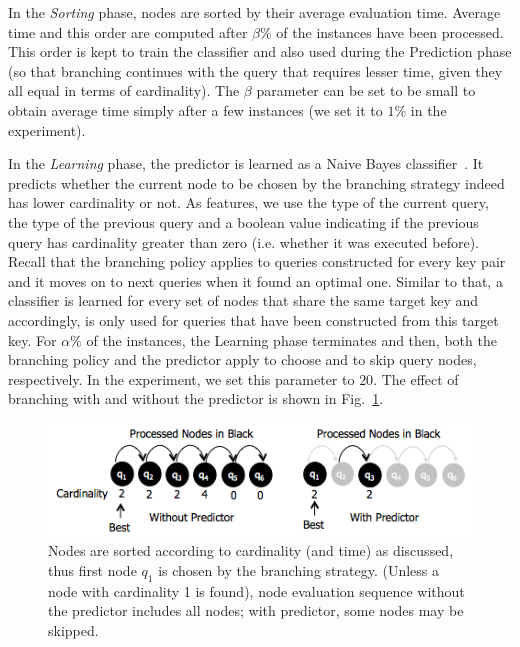 In the \emph{Sorting} phase, nodes are sorted by their average evaluation time. Average time and this order are computed after $\beta \%$ of the instances have been processed. This order is kept to train the classifier and also used during the Prediction phase (so that branching continues with the query that requires lesser time, given they all equal in terms of cardinality). The $\beta$ parameter can be set to be small to obtain average time simply after a few instances (we set it to $1\%$ in the experiment).
 
In the \emph{Learning} phase, the predictor is learned as a Naive Bayes classifier~\cite{Hand2001Idiots}. It predicts whether the current node to be chosen by the branching strategy indeed has lower cardinality or not. As features, we use the type of the current query, the type of the previous query and a boolean value indicating if the previous query has cardinality greater than zero (i.e. whether it was executed before). 
Recall that the branching policy applies to queries constructed for every key pair and it moves on to next queries when it found an optimal one. Similar to that, a classifier is learned for every set of nodes that share the same target key and accordingly, is only used for queries that have been constructed from this target key. 
For $\alpha \%$ of the instances, the Learning phase terminates and then, both the branching policy and the predictor apply to choose and to skip query nodes, respectively. In the experiment, we set this parameter to $20$. The effect of branching with and without the predictor is shown in Fig.~\ref{fig:pred}. 


\begin{figure} 
\vspace{-10pt}
\centering
\includegraphics[scale=0.5]{p26.png}
\caption{Nodes are sorted according to cardinality (and time) as discussed, thus first node $q_1$ is chosen by the branching strategy. (Unless a node with cardinality 1 is found), node evaluation sequence without the predictor includes all nodes; with predictor, some nodes may be skipped.} 
\vspace{-15pt}
\label{fig:pred}
\end{figure} 

 


